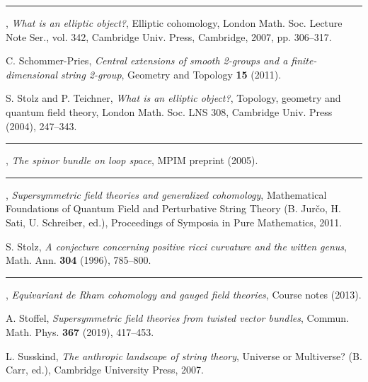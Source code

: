 \begin{description}[leftmargin=5.6em,labelwidth=5.2em,labelsep=0.4em,itemsep=0.5ex,parsep=0pt,topsep=0.8ex]
\item[\textbf{[Seg07]}] \rule[0.45ex]{2.6em}{0.45pt}, \textit{What is an elliptic object?}, Elliptic cohomology, London Math. Soc. Lecture Note Ser., vol. 342, Cambridge Univ. Press, Cambridge, 2007, pp. 306--317.
\item[\textbf{[SP11]}] C. Schommer-Pries, \textit{Central extensions of smooth 2-groups and a finite-dimensional string 2-group}, Geometry and Topology \textbf{15} (2011).
\item[\textbf{[ST04]}] S. Stolz and P. Teichner, \textit{What is an elliptic object?}, Topology, geometry and quantum field theory, London Math. Soc. LNS 308, Cambridge Univ. Press (2004), 247--343.
\item[\textbf{[ST05]}] \rule[0.45ex]{2.6em}{0.45pt}, \textit{The spinor bundle on loop space}, MPIM preprint (2005).
\item[\textbf{[ST11]}] \rule[0.45ex]{2.6em}{0.45pt}, \textit{Supersymmetric field theories and generalized cohomology}, Mathematical Foundations of Quantum Field and Perturbative String Theory (B. Jur\v{c}o, H. Sati, U. Schreiber, ed.), Proceedings of Symposia in Pure Mathematics, 2011.
\item[\textbf{[Sto96]}] S. Stolz, \textit{A conjecture concerning positive ricci curvature and the witten genus}, Math. Ann. \textbf{304} (1996), 785--800.
\item[\textbf{[Sto13]}] \rule[0.45ex]{2.6em}{0.45pt}, \textit{Equivariant de Rham cohomology and gauged field theories}, Course notes (2013).
\item[\textbf{[Sto19]}] A. Stoffel, \textit{Supersymmetric field theories from twisted vector bundles}, Commun. Math. Phys. \textbf{367} (2019), 417--453.
\item[\textbf{[Sus07]}] L. Susskind, \textit{The anthropic landscape of string theory}, Universe or Multiverse? (B. Carr, ed.), Cambridge University Press, 2007.


\end{description}
